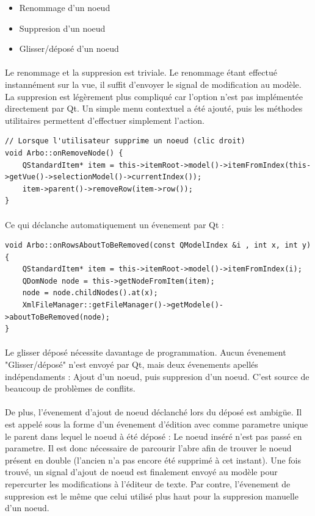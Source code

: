 \begin{itemize}
\item Renommage d'un noeud
\item Suppresion d'un noeud
\item Glisser/déposé d'un noeud
\end{itemize}

\paragraph{}
Le renommage et la suppresion est triviale. Le renommage étant effectué instannément sur la vue, il suffit d'envoyer le signal de modification au modèle. La suppresion est légèrement plus compliqué car l'option n'est pas implémentée directement par Qt. Un simple menu contextuel a été ajouté, puis les méthodes utilitaires permettent d'effectuer simplement l'action.

\begin{lstlisting}
// Lorsque l'utilisateur supprime un noeud (clic droit)
void Arbo::onRemoveNode() {
    QStandardItem* item = this->itemRoot->model()->itemFromIndex(this->getVue()->selectionModel()->currentIndex());
    item->parent()->removeRow(item->row());
}
\end{lstlisting}

\paragraph{}
Ce qui déclanche automatiquement un évenement par Qt :
\begin{lstlisting}
void Arbo::onRowsAboutToBeRemoved(const QModelIndex &i , int x, int y)
{
    QStandardItem* item = this->itemRoot->model()->itemFromIndex(i);
    QDomNode node = this->getNodeFromItem(item);
    node = node.childNodes().at(x);
    XmlFileManager::getFileManager()->getModele()->aboutToBeRemoved(node);
}
\end{lstlisting}

\paragraph{}
Le glisser déposé nécessite davantage de programmation. Aucun évenement "Glisser/déposé" n'est envoyé par Qt, mais deux évenements apellés indépendaments : Ajout d'un noeud, puis suppresion d'un noeud. C'est source de beaucoup de problèmes de conflits.

\paragraph{}
De plus, l'évenement d'ajout de noeud déclanché lors du déposé est ambigüe. Il est appelé sous la forme d'un évenement d'édition avec comme parametre unique le parent dans lequel le noeud à été déposé : Le noeud inséré n'est pas passé en parametre.
Il est donc nécessaire de parcourir l'abre afin de trouver le noeud présent en double (l'ancien n'a pas encore été supprimé à cet instant). Une fois trouvé, un signal d'ajout de noeud est finalement envoyé au modèle pour repercurter les modifications à l'éditeur de texte.
Par contre, l'évenement de suppresion est le même que celui utilisé plus haut pour la suppresion manuelle d'un noeud.


